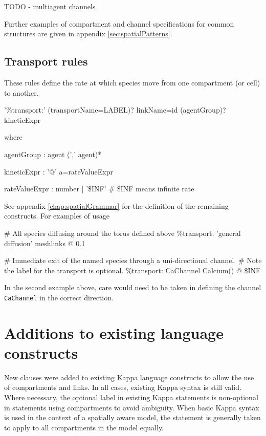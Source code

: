 TODO - multiagent channels

Further examples of compartment and channel specifications for common structures are given in appendix
 \ref{sec:spatialPatterns}.

\subsection{Transport rules}

These rules define the rate at which species move from one compartment (or cell) to another.
\begin{bnfsource}
'\%transport:' (transportName=LABEL)? linkName=id (agentGroup)? kineticExpr
\end{bnfsource}
  where
\begin{bnfsource}
agentGroup :
  agent (',' agent)*

kineticExpr :
  '@' a=rateValueExpr

rateValueExpr :
  number | '\$INF'   # \$INF means infinite rate
\end{bnfsource}

See appendix \ref{chap:spatialGrammar} for the definition of the remaining constructs. For examples of usage

\begin{kappasource}
# All species diffusing around the torus defined above
\%transport: 'general diffusion' meshlinks @ 0.1

# Immediate exit of the named species through a uni-directional channel.
# Note the label for the transport is optional.
\%transport: CaChannel Calcium() @ \$INF
\end{kappasource}

In the second example above, care would need to be taken in defining the channel \verb|CaChannel| in the correct direction.

\section{Additions to existing language constructs}

New clauses were added to existing Kappa language constructs to allow the use of compartments and links. In all cases, existing Kappa syntax is still valid. Where necessary, the optional label in existing Kappa statements is non-optional in statements using compartments to avoid ambiguity. When basic Kappa syntax is used in the context of a spatially aware model, the statement is generally taken to apply to all compartments in the model equally.

